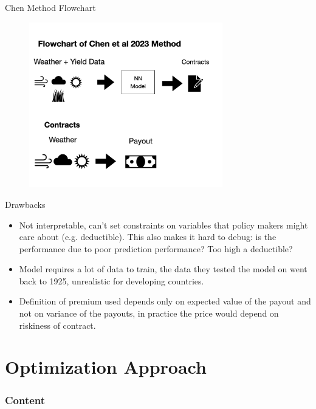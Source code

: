 \documentclass{beamer}
\begin{document}
\begin{frame}{Chen Method Flowchart}
        \begin{figure}
            \includegraphics[width=0.75\textwidth]{../../../output/figures/Chen Flowchart.png}
        \end{figure}
    \end{frame}

\begin{frame}{Drawbacks}
    \begin{itemize}
        \setlength\itemsep{2em}
        \item Not interpretable, can't set constraints on variables that policy makers might care about (e.g. deductible). This also makes it hard to debug: is the performance due to poor prediction performance? Too high a deductible? 
        \item Model requires a lot of data to train, the data they tested the model on went back to 1925, unrealistic for developing countries. 
        \item Definition of premium used depends only on expected value of the payout and not on variance of the payouts, in practice the price would depend on riskiness of contract. 
    \end{itemize}    
    \end{frame}

\section{Optimization Approach}
\begin{frame}
    \frametitle{Content}
    \tableofcontents[currentsection]
  \end{frame}
\end{document}
